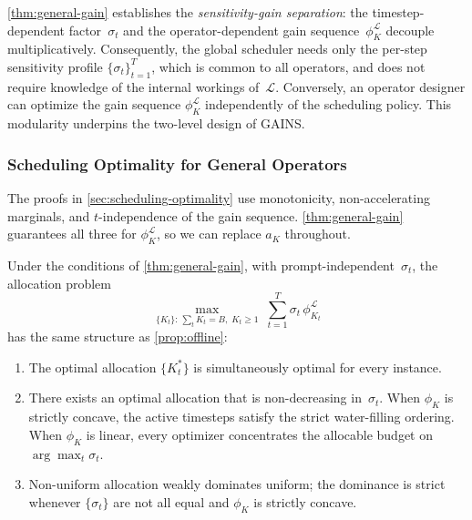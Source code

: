 \begin{remark}
\label{rmk:separation}
\cref{thm:general-gain} establishes the \emph{sensitivity-gain separation}: the
timestep-dependent factor~$\sigma_t$ and the operator-dependent gain
sequence~$\phi_K^{\mathcal{L}}$ decouple multiplicatively.
Consequently, the global scheduler needs only the per-step sensitivity
profile $\{\sigma_t\}_{t=1}^T$, which is common to all operators,
and does not require knowledge of the internal workings of~$\mathcal{L}$.
Conversely, an operator designer can optimize the gain sequence
$\phi_K^{\mathcal{L}}$ independently of the scheduling policy.
This modularity underpins the two-level design of GAINS.
\end{remark}

\subsubsection{Scheduling Optimality for General Operators}
\label{sec:general-scheduling}

The proofs in \cref{sec:scheduling-optimality} use monotonicity,
non-accelerating marginals, and $t$-independence of the gain
sequence.
\cref{thm:general-gain} guarantees all three for
$\phi_K^{\mathcal{L}}$, so we can replace $a_K$ throughout.

\begin{corollary}
\label{cor:offline-general}
Under the conditions of \cref{thm:general-gain}, with
prompt-independent~$\sigma_t$,
the allocation problem
\begin{equation}
  \max_{\{K_t\}:\,\sum_t K_t=B,\;K_t\ge 1}\;
  \sum_{t=1}^{T}\sigma_t\,\phi_{K_t}^{\mathcal{L}}
  \label{eq:alloc-general}
\end{equation}
has the same structure as \cref{prop:offline}:
\begin{enumerate}
\item[\textup{(i)}]
  The optimal allocation $\{K_t^*\}$ is simultaneously optimal for
  every instance.
\item[\textup{(ii)}]
  There exists an optimal allocation that is non-decreasing
  in~$\sigma_t$.
  When $\phi_K$ is strictly concave, the active timesteps satisfy
  the strict water-filling ordering.
  When $\phi_K$ is linear, every optimizer concentrates the
  allocable budget on $\arg\max_t\sigma_t$.
\item[\textup{(iii)}]
  Non-uniform allocation weakly dominates uniform; the
  dominance is strict whenever $\{\sigma_t\}$ are not all equal
  and $\phi_K$ is strictly concave.
\end{enumerate}
\end{corollary}

